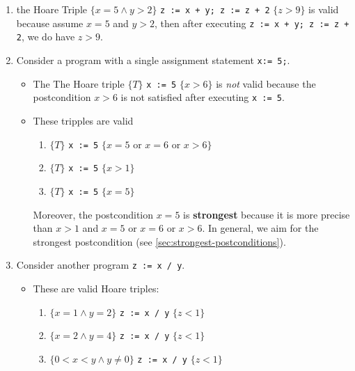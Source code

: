 \documentclass[oneside,11pt,dvipsnames]{book}
\newcommand{\code}[1]{\texttt{#1}}
\begin{document}
\begin{enumerate}
\item the Hoare Triple  $\{ x = 5 \land y > 2\}$ \; \code{z := x + y; z := z + 2} \; $\{z > 9\}$ is valid because assume $x=5$ and $y > 2$, then after executing \code{z := x + y; z := z + 2}, we do have $z > 9$.

\item
  Consider a program with a single assignment statement \texttt{x:= 5;}.

  \begin{itemize}
    \item The The Hoare triple $\{ T \}$ \texttt{x := 5} $\{ x > 6 \}$ is \emph{not} valid because the postcondition $x > 6$ is not satisfied after executing \texttt{x := 5}.
    
    \item These tripples are valid

  \begin{enumerate}
  \item $\{ T \}$ \texttt{x := 5} $\{ x = 5 \text{ or } x = 6 \text{ or } x > 6 \}$
  \item $\{ T \}$ \texttt{x := 5} $\{ x > 1 \}$
  \item $\{ T \}$ \texttt{x := 5} $\{ x = 5 \}$
  \end{enumerate}

  Moreover, the postcondition \( x = 5 \) is \textbf{strongest} because it is more precise than \( x > 1 \) and \( x = 5 \text{ or } x = 6 \text{ or } x > 6 \). In general, we aim for the strongest postcondition (see \autoref{sec:strongest-postconditions}).
\end{itemize}
   
\item Consider another program \texttt{z := x / y}.
    \begin{itemize}
        \item These are valid Hoare triples:
        
        \begin{enumerate}
        \item
        \( \{ x = 1 \land y = 2 \} \) \texttt{z := x / y} \( \{ z < 1 \} \)
        \item
        \( \{ x = 2 \land y = 4 \} \) \texttt{z := x / y} \( \{ z < 1 \} \)
        \item
        \( \{ 0 < x < y \land y \neq 0 \} \) \texttt{z := x / y} \( \{ z < 1 \} \)
        \end{enumerate}
  

\end{itemize}
\end{enumerate}
\end{document}
